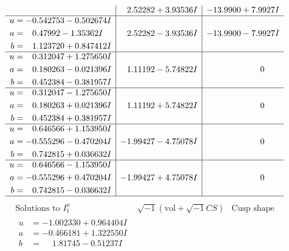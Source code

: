 \documentclass[1p]{elsarticle_modified}
\theoremstyle{definition}
\newcommand{\I}{\sqrt{-1}}
\begin{document}
$$\begin{array}{c|c|c}
 & \phantom{-}2.52282 + 3.93536 I & -13.9900 + 7.9927 I \\ \hline\begin{aligned}
u &= -0.542753 - 0.502674 I \\
a &= \phantom{-}0.47992 - 1.35362 I \\
b &= \phantom{-}1.123720 + 0.847412 I\end{aligned}
 & \phantom{-}2.52282 - 3.93536 I & -13.9900 - 7.9927 I \\ \hline\begin{aligned}
u &= \phantom{-}0.312047 + 1.275650 I \\
a &= \phantom{-}0.180263 - 0.021396 I \\
b &= \phantom{-}0.452384 - 0.381957 I\end{aligned}
 & \phantom{-}1.11192 - 5.74822 I & \phantom{-0.000000 } 0 \\ \hline\begin{aligned}
u &= \phantom{-}0.312047 - 1.275650 I \\
a &= \phantom{-}0.180263 + 0.021396 I \\
b &= \phantom{-}0.452384 + 0.381957 I\end{aligned}
 & \phantom{-}1.11192 + 5.74822 I & \phantom{-0.000000 } 0 \\ \hline\begin{aligned}
u &= \phantom{-}0.646566 + 1.153950 I \\
a &= -0.555296 - 0.470204 I \\
b &= \phantom{-}0.742815 + 0.036632 I\end{aligned}
 & -1.99427 - 4.75078 I & \phantom{-0.000000 } 0 \\ \hline\begin{aligned}
u &= \phantom{-}0.646566 - 1.153950 I \\
a &= -0.555296 + 0.470204 I \\
b &= \phantom{-}0.742815 - 0.036632 I\end{aligned}
 & -1.99427 + 4.75078 I & \phantom{-0.000000 } 0\\
 \hline 
 \end{array}$$\newpage$$\begin{array}{c|c|c}  
\text{Solutions to }I^u_{1}& \I (\text{vol} + \sqrt{-1}CS) & \text{Cusp shape}\\
 \hline 
\begin{aligned}
u &= -1.002330 + 0.964404 I \\
a &= -0.466181 + 1.322550 I \\
b &= \phantom{-}1.81745 - 0.51237 I\end{aligned}

\end{array}$$
\end{document}
